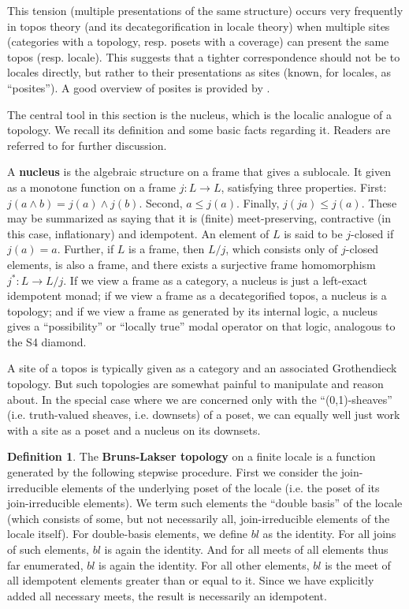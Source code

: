 \documentclass[hoptionsi,review,screen,format=sigconf]{acmart}
\theoremstyle{definition}
\newtheorem{definition}{Definition}[section]
\begin{document}
This tension (multiple presentations of the same structure) occurs very frequently in topos theory (and its decategorification in locale theory) when multiple sites (categories with a topology, resp. posets with a coverage) can present the same topos (resp. locale). This suggests that a tighter correspondence should not be to locales directly, but rather to their presentations as sites (known, for locales, as ``posites''). A good overview of posites is provided by \cite{schultz2017temporal}.

The central tool in this section is the nucleus, which is the localic analogue of a topology. We recall its definition and some basic facts regarding it. Readers are referred to \cite{johnstone1982stone, vickers1996topology} for further discussion.

A \textbf{nucleus} is the algebraic structure on a frame that gives a sublocale. It given as a monotone function on a frame \(j : L \rightarrow L\), satisfying three properties. First: \(j(a \wedge b) = j(a) \wedge j(b)\). Second, \(a \le j(a)\). Finally, \(j(ja) \le j(a)\). These may be summarized as saying that it is (finite) meet-preserving, contractive (in this case, inflationary) and idempotent. An element of \(L\) is said to be \(j\)-closed if \(j(a)=a\). Further, if \(L\) is a frame, then \(L/j\), which consists only of \(j\)-closed elements, is also a frame, and there exists a surjective frame homomorphism \(j^* : L \rightarrow L/j\). If we view a frame as a category, a nucleus is just a left-exact idempotent monad; if we view a frame as a decategorified topos, a nucleus is a topology; and if we view a frame as generated by its internal logic, a nucleus gives a ``possibility'' or ``locally true'' modal operator on that logic, analogous to the S4 diamond.

A site of a topos is typically given as a category and an associated Grothendieck topology. But such topologies are somewhat painful to manipulate and reason about. In the special case where we are concerned only with the ``(0,1)-sheaves'' (i.e. truth-valued sheaves, i.e. downsets) of a poset, we can equally well just work with a site as a poset and a nucleus on its downsets.

\begin{definition}
The \textbf{Bruns-Lakser topology} on a finite locale is a function generated by the following stepwise procedure. First we consider the join-irreducible elements of the underlying poset of the locale (i.e. the poset of its join-irreducible elements). We term such elements the ``double basis'' of the locale (which consists of some, but not necessarily all, join-irreducible elements of the locale itself). For double-basis elements, we define \(bl\) as the identity. For all joins of such elements, \(bl\) is again the identity. And for all meets of all elements thus far enumerated, \(bl\) is again the identity. For all other elements, \(bl\) is the meet of all idempotent elements greater than or equal to it. Since we have explicitly added all necessary meets, the result is necessarily an idempotent.
\end{definition}
\end{document}
